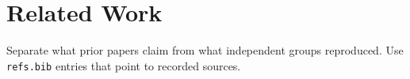 \section{Related Work}
\label{sec:related}
Separate what prior papers claim from what independent groups reproduced. Use
\texttt{refs.bib} entries that point to recorded sources.
